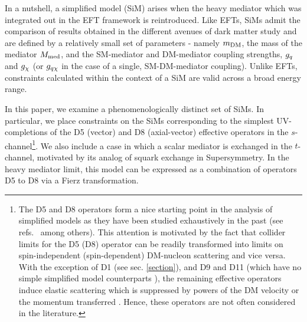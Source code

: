 In a nutshell, a simplified model (SiM) arises when the heavy mediator which was integrated out in the EFT framework is reintroduced. Like EFTs, SiMs admit the comparison of results obtained in the different avenues of dark matter study \cite{} and are defined by a relatively small set of parameters - namely $m_{\mathrm{DM}}$, the mass of the mediator $M_{\mathrm{med}}$, and the SM-mediator and DM-mediator coupling strengths, $g_q$ and $g_{\chi}$ (or $g_{q \chi}$ in the case of a single, SM-DM-mediator coupling). Unlike EFTs, constraints calculated within the context of a SiM are valid across a broad energy range.

In this paper, we examine a phenomenologically distinct set of SiMs. In particular, we place constraints on the SiMs corresponding to the simplest UV-completions of the D5 (vector) and D8 (axial-vector) effective operators in the $s$-channel\footnote{The D5 and D8 operators form a nice starting point in the analysis of simplified models as they have been studied exhaustively in the past (see refs.~\cite{Aad:1363019, ATLAS-CONF-2012-147, CMS-PAS-EXO-12-048, Buckley:2013jwa, Abdallah:1472683, MonoX, ValidEFT, ValidEFT_part2, ValidEFT_part3} among others). This attention is motivated by the fact that collider limits for the D5 (D8) operator can be readily transformed into limits on spin-independent (spin-dependent) DM-nucleon scattering and vice versa. With the exception of D1 (see sec. \ref{section}), and D9 and D11 (which have no simple simplified model counterparts \cite{}), the remaining effective operators induce elastic scattering which is suppressed by powers of the DM velocity or the momentum transferred \cite{Kumar}. Hence, these operators are not often considered in the literature.}. We also include a case in which a scalar mediator is exchanged in the $t$-channel, motivated by its analog of squark exchange in Supersymmetry. In the heavy mediator limit, this model can be expressed as a combination of operators D5 to D8 via a Fierz transformation.


